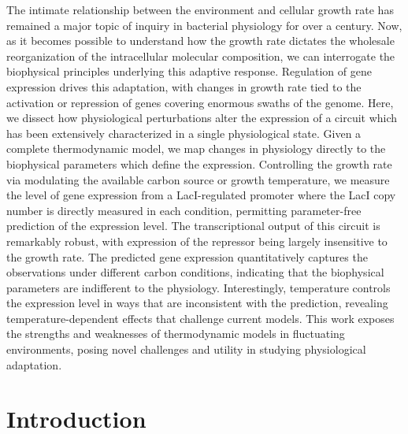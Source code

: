 \documentclass[12pt]{caltech_thesis}
\begin{document}
The intimate relationship between the environment and cellular growth
rate has remained a major topic of inquiry in bacterial physiology for
over a century. Now, as it becomes possible to understand how the growth
rate dictates the wholesale reorganization of the intracellular
molecular composition, we can interrogate the biophysical principles
underlying this adaptive response. Regulation of gene expression drives
this adaptation, with changes in growth rate tied to the activation or
repression of genes covering enormous swaths of the genome. Here, we
dissect how physiological perturbations alter the expression of a
circuit which has been extensively characterized in a single
physiological state. Given a complete thermodynamic model, we map
changes in physiology directly to the biophysical parameters which
define the expression. Controlling the growth rate via modulating the
available carbon source or growth temperature, we measure the level of
gene expression from a LacI-regulated promoter where the LacI copy
number is directly measured in each condition, permitting parameter-free
prediction of the expression level. The transcriptional output of this
circuit is remarkably robust, with expression of the repressor being
largely insensitive to the growth rate. The predicted gene expression
quantitatively captures the observations under different carbon
conditions, indicating that the biophysical parameters are indifferent
to the physiology. Interestingly, temperature controls the expression
level in ways that are inconsistent with the prediction, revealing
temperature-dependent effects that challenge current models. This work
exposes the strengths and weaknesses of thermodynamic models in
fluctuating environments, posing novel challenges and utility in
studying physiological adaptation.

\hypertarget{introduction-3}{%
\section{Introduction}\label{introduction-3}}
\end{document}
